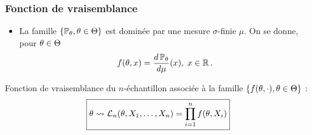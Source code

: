 
\begin{frame}
\frametitle{Fonction de vraisemblance}
\begin{itemize}
\item La famille $\{\operatorname{{\mathbb P}}_\theta,\theta \in \Theta\}$ est dominée par une mesure $\sigma$-finie $\mu$. On se donne, pour $\theta \in \Theta$
$$f(\theta,x) = \frac{d\operatorname{{\mathbb P}}_\theta}{d\mu}(x),\;x \in \operatorname{{\mathbb R}}.$$
\end{itemize}
\alert{Fonction de vraisemblance} du $n$-échantillon associée à la famille $\{f(\theta,\cdot),\theta \in \Theta\}$ :
$$\boxed{\theta \leadsto {\mathcal L}_n(\theta, X_1,\ldots, X_n) = \prod_{i = 1}^n f(\theta, X_i)}$$
\end{frame}

